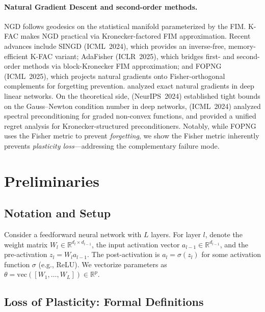 \documentclass{article}
\providecommand{\R}{\mathbb{R}}
\theoremstyle{plain}
\theoremstyle{definition}
\theoremstyle{remark}
\begin{document}
\paragraph{Natural Gradient Descent and second-order methods.}
NGD \citep{amari1998natural} follows geodesics on the statistical manifold parameterized by the FIM. K-FAC \citep{martens2015optimizing} makes NGD practical via Kronecker-factored FIM approximation. Recent advances include SINGD \citep{lin2024singd} (ICML~2024), which provides an inverse-free, memory-efficient K-FAC variant; AdaFisher \citep{adafisher2025} (ICLR~2025), which bridges first- and second-order methods via block-Kronecker FIM approximation; and FOPNG \citep{garg2025fopng} (ICML~2025), which projects natural gradients onto Fisher-orthogonal complements for forgetting prevention. \citet{bernacchia2018exact} analyzed exact natural gradients in deep linear networks. On the theoretical side, \citet{zhao2024gn} (NeurIPS~2024) established tight bounds on the Gauss--Newton condition number in deep networks, \citet{doikov2024spectral} (ICML~2024) analyzed spectral preconditioning for graded non-convex functions, and \citet{xie2025structured} provided a unified regret analysis for Kronecker-structured preconditioners. Notably, while FOPNG uses the Fisher metric to prevent \emph{forgetting}, we show the Fisher metric inherently prevents \emph{plasticity loss}---addressing the complementary failure mode.

\section{Preliminaries}
\label{sec:prelim}

\subsection{Notation and Setup}

Consider a feedforward neural network with $L$ layers. For layer $l$, denote the weight matrix $W_l \in \R^{d_{l} \times d_{l-1}}$, the input activation vector $a_{l-1} \in \R^{d_{l-1}}$, and the pre-activation $z_l = W_l a_{l-1}$. The post-activation is $a_l = \sigma(z_l)$ for some activation function $\sigma$ (e.g., ReLU). We vectorize parameters as $\theta = \mathrm{vec}([W_1, \ldots, W_L]) \in \R^p$.

\subsection{Loss of Plasticity: Formal Definitions}
\end{document}
